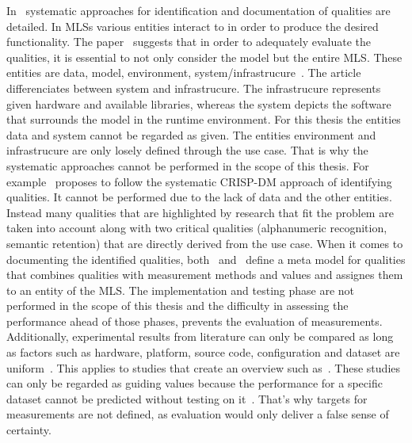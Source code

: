 In~\cite{nakamichi_requirements-driven_2020,siebert_construction_2021} systematic approaches for
identification and documentation of qualities are detailed.
In \acp{MLS} various entities interact to in order to produce the desired functionality.
The paper~\cite{nakamichi_requirements-driven_2020} suggests that in order to adequately evaluate
the qualities, it is essential to not only consider the model but the entire \ac{MLS}.
These entities are data, model, environment,
system/infrastrucure~\citep{nakamichi_requirements-driven_2020, siebert_construction_2021}.
The article~\cite{siebert_construction_2021} differenciates between system and infrastrucure.
The infrastrucure represents given hardware and available libraries, whereas the system depicts
the software that surrounds the model in the runtime environment.
For this thesis the entities data and system cannot be regarded as given.
The entities environment and infrastrucure are only losely defined through the use case.
That is why the systematic approaches cannot be performed in the scope of this thesis.
For example~\cite{siebert_construction_2021} proposes to follow the systematic CRISP-DM approach of
identifying qualities.
It cannot be performed due to the lack of data and the other entities.
Instead many qualities that are highlighted by research that fit the problem are taken into account
along with two critical qualities (alphanumeric recognition, semantic retention) that are directly
derived from the use case.
When it comes to documenting the identified qualities,
both~\cite{nakamichi_requirements-driven_2020} and~\cite{siebert_construction_2021} define a meta
model for qualities that combines qualities with
measurement methods and values and assignes them to an entity of the \ac{MLS}.
The implementation and testing phase are not performed in the scope of this thesis and the
difficulty in assessing the performance ahead of those phases, prevents the evaluation
of measurements.
Additionally, experimental results from literature can only be compared as long as factors such as
hardware, platform, source code, configuration and dataset are uniform~\citep{arpteg_software_2018}.
This applies to studies that create an overview such as~\cite{chen_text_2021,long_scene_2021}.
These studies can only be regarded as guiding values because the performance for a specific dataset
cannot be predicted without testing on it~\cite{arpteg_software_2018}.
That's why targets for measurements are not defined, as evaluation would only deliver a false
sense of certainty.

